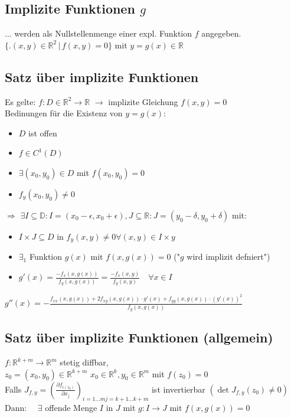 \documentclass[6pt,a4paper]{scrartcl}
\newcommand{\iset}[2]{\ensuremath{\bigl\{ \bigl. #1 \, \bigr| \, #2 \bigr\}}}					%
\renewcommand{\emph}[1]{\textbf{#1}}															%
\newcommand{\Ra}[0]{\ensuremath{\Rightarrow}}									%
\newcommand{\ra}[0]{\ensuremath{\rightarrow}} 									%
\begin{document}
\begin{multicols*}{4}
\section{Implizite Funktionen $g$}
... werden als Nullstellenmenge einer expl. Funktion $f$ angegeben.\\
$\iset{(x,y) \in \mathbb R^2 }{f(x,y) = 0}$ mit $y=g(x) \in \mathbb R$

\subsection{Satz über implizite Funktionen}
Es gelte: $f: D \in \mathbb R^2 \ra \mathbb R$ \quad
$\ra $ implizite Gleichung $f(x,y) = 0$ \\
Bedinungen für die Existenz von $y = g(x)$:
\begin{itemize} \itemsep0pt
	\item $D$ ist offen
	\item $f \in C^1 (D)$
	\item $\exists (x_0, y_0) \in D$ mit $f(x_0, y_0) = 0$
	\item $f_y(x_0, y_0) \not = 0$
\end{itemize}
\emph{$\Ra$} $ \exists I \subseteq \mathbb D: I = (x_0 - \epsilon, x_0 + \epsilon) , J \subseteq \mathbb R: J = (y_0 - \delta, y_0 + \delta)$ mit:
\begin{itemize}\itemsep0pt
	\item $I \times J \subseteq D$ in $f_y (x,y) \not = 0 \forall (x,y) \in I \times y$
	\item $\exists_1$ Funktion $g(x)$ mit $f(x,g(x)) = 0$ ("$g$ wird implizit defniert")
	\item $g'(x) = \frac{-f_x(x, g(x))}{f_y (x, g(x))} = \frac{-f_x(x, y)}{f_y (x, y)} \quad \forall x \in I$ 
\end{itemize}

	
$g''(x) = - \frac{f_{xx} (x, g(x)) + 2f_{xy}(x,g(x)) \cdot g'(x) + f_{yy} (x, g(x)) \cdot (g'(x))^2}{f_y (x, g(x))} $

\subsection{Satz über implizite Funktionen (allgemein)}
$f: \mathbb R^{k+m} \ra \mathbb R^m$ stetig diffbar,\\ $z_0 = (x_0, y_0) \in \mathbb R^{k+m}$  	$x_0 \in \mathbb R^k, y_0 \in \mathbb R^m$ mit $f(z_0) = 0$
\\
Falls $J_{f,y} = (\frac{\partial f_{i(z_0)}}{\partial x_j})_{i = 1 \ldots m j= k +1 \ldots k+m}$ ist invertierbar $(\det J_{f,y} (z_0) \not = 0)$
\\
Dann: $\quad \exists$ offende Menge $I$ in $J$ mit $g: I \ra J$ mit $f(x,g(x)) = 0$ 



\end{multicols*}
\end{document}
